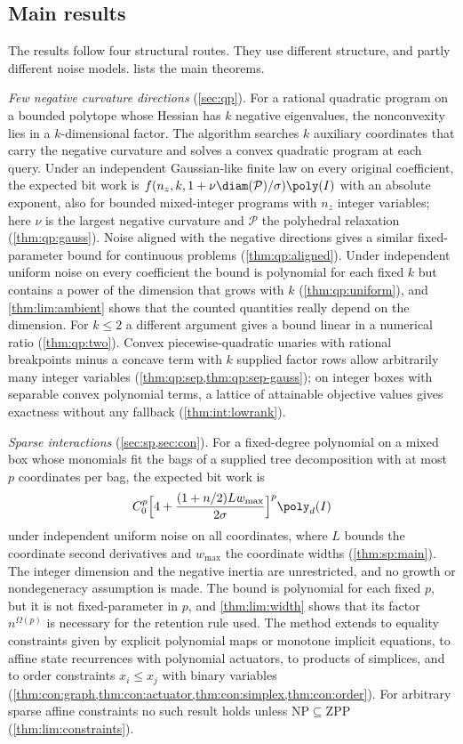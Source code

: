 \subsection{Main results}\label{sec:intro:results}

The results follow four structural routes. They use different structure,
and partly different noise models.  lists the main
theorems.

\emph{Few negative curvature directions} (\cref{sec:qp}). For a rational
quadratic program on a bounded polytope whose Hessian has $k$ negative
eigenvalues, the nonconvexity lies in a $k$-dimensional factor. The
algorithm searches $k$ auxiliary coordinates that carry the negative
curvature and solves a convex quadratic program at each query. Under an
independent Gaussian-like finite law on every original coefficient, the
expected bit work is $f(n_z,k,1+\nu\diam(\mathcal P)/\sigma)\poly(I)$ with an
absolute exponent, also for bounded mixed-integer programs with $n_z$
integer variables; here $\nu$ is the largest negative curvature and
$\mathcal P$ the polyhedral relaxation (\cref{thm:qp:gauss}). Noise aligned
with the negative directions gives a similar fixed-parameter bound for
continuous problems (\cref{thm:qp:aligned}). Under independent uniform noise
on every coefficient the bound is polynomial for each fixed $k$ but contains
a power of the dimension that grows with $k$ (\cref{thm:qp:uniform}), and
\cref{thm:lim:ambient} shows that the counted quantities really depend on
the dimension. For $k\le2$ a different argument gives a bound linear in a
numerical ratio (\cref{thm:qp:two}). Convex piecewise-quadratic unaries with
rational breakpoints minus a concave term with $k$ supplied factor rows allow
arbitrarily many integer variables
(\cref{thm:qp:sep,thm:qp:sep-gauss}); on integer boxes with separable convex
polynomial terms, a lattice of attainable objective values gives exactness
without any fallback (\cref{thm:int:lowrank}).

\emph{Sparse interactions} (\cref{sec:sp,sec:con}). For a fixed-degree
polynomial on a mixed box whose monomials fit the bags of a supplied tree
decomposition with at most $p$ coordinates per bag, the expected bit work is
\[
 C_0^p\Bigl[4+\frac{(1+n/2)Lw_{\max}}{2\sigma}\Bigr]^p\poly_d(I)
\]
under independent uniform noise on all coordinates, where $L$ bounds the
coordinate second derivatives and $w_{\max}$ the coordinate widths
(\cref{thm:sp:main}). The integer dimension and the negative inertia are
unrestricted, and no growth or nondegeneracy assumption is made. The bound is
polynomial for each fixed $p$, but it is not fixed-parameter in $p$, and
\cref{thm:lim:width} shows that its factor $n^{\Omega(p)}$ is necessary for
the retention rule used. The method extends to equality constraints given by
explicit polynomial maps or monotone implicit equations, to affine state
recurrences with polynomial actuators, to products of simplices, and to
order constraints $x_i\le x_j$ with binary variables
(\cref{thm:con:graph,thm:con:actuator,thm:con:simplex,thm:con:order}). For
arbitrary sparse affine constraints no such result holds unless
$\mathrm{NP}\subseteq\mathrm{ZPP}$ (\cref{thm:lim:constraints}).


